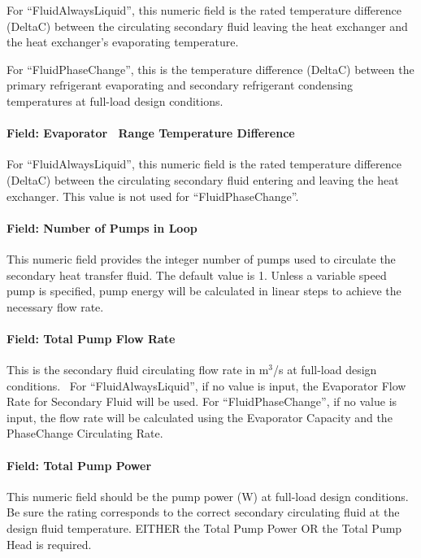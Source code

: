 For ``FluidAlwaysLiquid'', this numeric field is the rated temperature difference (DeltaC) between the circulating secondary fluid leaving the heat exchanger and the heat exchanger's evaporating temperature.

For ``FluidPhaseChange'', this is the temperature difference (DeltaC) between the primary refrigerant evaporating and secondary refrigerant condensing temperatures at full-load design conditions.

\paragraph{Field: Evaporator ~Range Temperature Difference}\label{field-evaporator-range-temperature-difference}

For ``FluidAlwaysLiquid'', this numeric field is the rated temperature difference (DeltaC) between the circulating secondary fluid entering and leaving the heat exchanger. This value is not used for ``FluidPhaseChange''.

\paragraph{Field: Number of Pumps in Loop}\label{field-number-of-pumps-in-loop}

This numeric field provides the integer number of pumps used to circulate the secondary heat transfer fluid. The default value is 1. Unless a variable speed pump is specified, pump energy will be calculated in linear steps to achieve the necessary flow rate.

\paragraph{Field: Total Pump Flow Rate}\label{field-total-pump-flow-rate}

This is the secondary fluid circulating flow rate in m\(^{3}\)/s at full-load design conditions.~ For ``FluidAlwaysLiquid'', if no value is input, the Evaporator Flow Rate for Secondary Fluid will be used. For ``FluidPhaseChange'', if no value is input, the flow rate will be calculated using the Evaporator Capacity and the PhaseChange Circulating Rate.

\paragraph{Field: Total Pump Power}\label{field-total-pump-power}

This numeric field should be the pump power (W) at full-load design conditions.~ Be sure the rating corresponds to the correct secondary circulating fluid at the design fluid temperature. EITHER the Total Pump Power OR the Total Pump Head is required.

